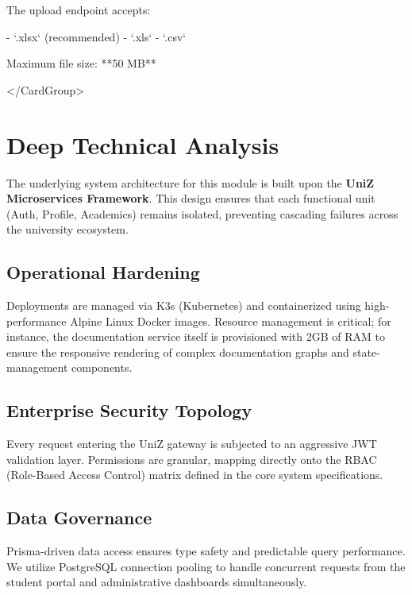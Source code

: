 
  
\begin{tcolorbox}[colback=gray!5,colframe=primary,title=Documentation Note]

    The upload endpoint accepts:

    - `.xlsx` (recommended)
    - `.xls`
    - `.csv`

    Maximum file size: **50 MB**

  
\end{tcolorbox}

</CardGroup>


\section{Deep Technical Analysis}
The underlying system architecture for this module is built upon the \textbf{UniZ Microservices Framework}. 
This design ensures that each functional unit (Auth, Profile, Academics) remains isolated, preventing cascading failures across the university ecosystem.

\subsection{Operational Hardening}
Deployments are managed via K3s (Kubernetes) and containerized using high-performance Alpine Linux Docker images. 
Resource management is critical; for instance, the documentation service itself is provisioned with 2GB of RAM to ensure the responsive rendering of complex documentation graphs and state-management components.

\subsection{Enterprise Security Topology}
Every request entering the UniZ gateway is subjected to an aggressive JWT validation layer. 
Permissions are granular, mapping directly onto the RBAC (Role-Based Access Control) matrix defined in the core system specifications.

\subsection{Data Governance}
Prisma-driven data access ensures type safety and predictable query performance. 
We utilize PostgreSQL connection pooling to handle concurrent requests from the student portal and administrative dashboards simultaneously.
